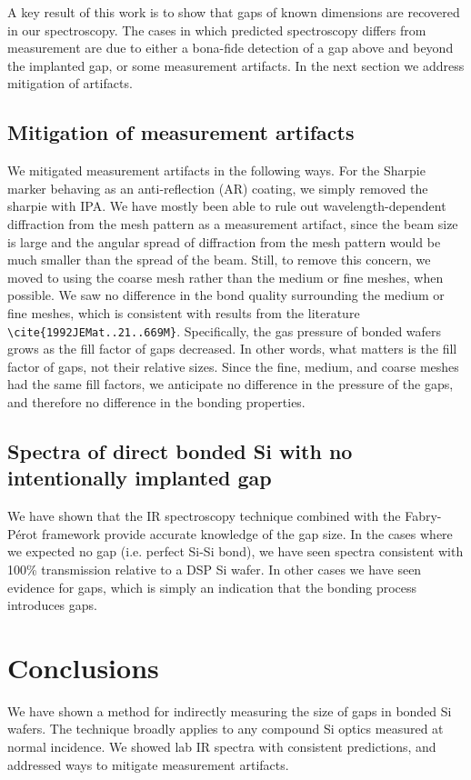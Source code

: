 \documentclass[osajnl,preprint,showpacs,superscriptaddress,12pt]{revtex4-1} %
\begin{document}
A key result of this work is to show that gaps of known dimensions are recovered in our spectroscopy.  The cases in which predicted spectroscopy differs from measurement are due to either a bona-fide detection of a gap above and beyond the implanted gap, or some measurement artifacts.  In the next section we address mitigation of artifacts.

\subsection{Mitigation of measurement artifacts}
We mitigated measurement artifacts in the following ways.  For the Sharpie marker behaving as an anti-reflection (AR) coating, we simply removed the sharpie with IPA.  We have mostly been able to rule out wavelength-dependent diffraction from the mesh pattern as a measurement artifact, since the beam size is large and the angular spread of diffraction from the mesh pattern would be much smaller than the spread of the beam.  Still, to remove this concern, we moved to using the coarse mesh rather than the medium or fine meshes, when possible.  We saw no difference in the bond quality surrounding the medium or fine meshes, which is consistent with results from the literature \verb|\cite{1992JEMat..21..669M}|.  Specifically, the gas pressure of bonded wafers grows as the fill factor of gaps decreased.  In other words, what matters is the fill factor of gaps, not their relative sizes.  Since the fine, medium, and coarse meshes had the same fill factors, we anticipate no difference in the pressure of the gaps, and therefore no difference in the bonding properties.


\subsection{Spectra of direct bonded Si with no intentionally implanted gap}
We have shown that the IR spectroscopy technique combined with the Fabry-P\'{e}rot framework provide accurate knowledge of the gap size.  In the cases where we expected no gap (i.e. perfect Si-Si bond), we have seen spectra consistent with 100\% transmission relative to a DSP Si wafer.  In other cases we have seen evidence for gaps, which is simply an indication that the bonding process introduces gaps.

\section{Conclusions}
We have shown a method for indirectly measuring the size of gaps in bonded Si wafers.  The technique broadly applies to any compound Si optics measured at normal incidence.  We showed lab IR spectra with consistent predictions, and addressed ways to mitigate measurement artifacts. 
\end{document}
